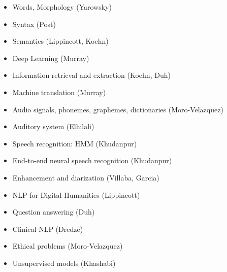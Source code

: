 \documentclass[landscape]{jhuslides3C}
\begin{document}

\vfill
\begin{itemize} \itemsep 0mm
\item Words, Morphology (Yarowsky)
\item Syntax (Post)
\item Semantics (Lippincott, Koehn)
\item Deep Learning (Murray)
\item Information retrieval and extraction (Koehn, Duh)
\item Machine translation (Murray)
\end{itemize}
\vfill




\vfill
\begin{itemize} \itemsep 0mm
\item Audio signals, phonemes, graphemes, dictionaries (Moro-Velazquez)
\item Auditory system (Elhilali)
\item Speech recognition: HMM (Khudanpur)
\item End-to-end neural speech recognition (Khudanpur) 
\item Enhancement and diarization (Villaba, Garcia)
\end{itemize}
\vfill


\vfill
\begin{itemize} \itemsep 0mm
\item NLP for Digital Humanities (Lippincott)
\item Question answering (Duh)
\item Clinical NLP (Dredze)
\item Ethical problems (Moro-Velazquez)
\item Unsupervised models (Khashabi)
\end{itemize}
\vfill

\end{document}
